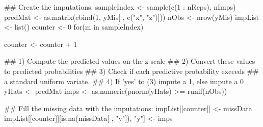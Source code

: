 \begin{Schunk}
\begin{Sinput}
 ## Create the imputations:
 sampleIndex <- sample(c(1 : nReps), nImps)
 predMat <- as.matrix(cbind(1, yMis[ , c("x", "z")]))
 nObs <- nrow(yMis)
 impList <- list()
 counter <- 0
 for(m in sampleIndex) {
     counter <- counter + 1
 
     ## 1) Compute the predicted values on the z-scale
     ## 2) Convert these values to predicted probabilities
     ## 3) Check if each predictive probability exceeds
     ##    a standard uniform variate.
     ## 4) If 'yes' to (3) impute a 1, else impute a 0
     yHats <- predMat %*% coefSams[m, ]
     imps <- as.numeric(pnorm(yHats) >= runif(nObs))
 
     ## Fill the missing data with the imputations:
     impList[[counter]] <- missData
     impList[[counter]][is.na(missData[ , "y"]), "y"] <- imps
 }
\end{Sinput}
\end{Schunk}
